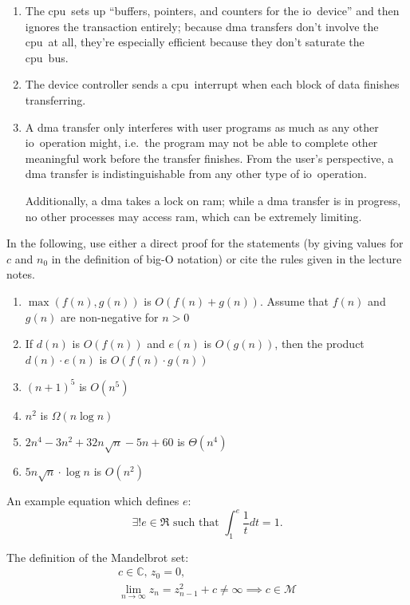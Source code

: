 \documentclass[
	gantt,
	scheme,
	assembly,
	math,
	pseudocode,
	tabu
]{brandeis-problemset}
\newcommand{\io}{\ac{io}}
\newcommand{\cpu}{\ac{cpu}}
\begin{document}
\begin{enumerate}
	\item The \cpu\ sets up ``buffers, pointers, and counters for the
		\io\ device'' and then ignores the transaction entirely;
		because \ac{dma} transfers don't involve the \cpu\ at all,
		they're especially efficient because they don't saturate the
		\cpu\ bus.
	\item The device controller sends a \cpu\ interrupt when each block of
		data finishes transferring.
	\item A \ac{dma} transfer only interferes with user programs as much
		as any other \io\ operation might, i.e.\ the program may not
		be able to complete other meaningful work before the
		transfer finishes. From the user's perspective, a \ac{dma}
		transfer is indistinguishable from any other type of \io\
		operation.

		Additionally, a \ac{dma} takes a lock on \ac{ram}; while a
		\ac{dma} transfer is in progress, no other processes may
		access \ac{ram}, which can be extremely limiting.
\end{enumerate}

\begin{problem}
	In the following, use either a direct proof for the statements (by
	giving values for $c$ and $n_0$ in the definition of big-O notation)
	or cite the rules given in the lecture notes.

	\begin{enumerate}
		\item $\max(f(n), g(n))$ is $O(f(n) + g(n))$. Assume that $f(n)$
			and $g(n)$ are non-negative for $n > 0$
		\item  If $d(n)$ is $O(f(n))$ and $e(n)$ is $O(g(n))$, then
			the product $d(n) \cdot e(n)$ is $O(f(n) \cdot g(n))$
		\item $(n + 1)^5$ is $O(n^5)$
		\item $n^2$ is $\Omega(n\log n)$
		\item $2n^4 - 3n^2 + 32n\sqrt n - 5n + 60$ is $\Theta(n^4)$
		\item $5n\sqrt n \cdot \log n$ is $O(n^2)$
	\end{enumerate}
\end{problem}

An example equation which defines $e$:
\begin{equation}
	\exists! e \in \Re \text{ such that }
	\int_1^e \frac{1}{t} dt = 1.
\end{equation}

The definition of the Mandelbrot set:
\begin{equation}
\begin{split}
		c \in \mathbb{C},\, z_0 = 0, \\
		\lim_{n \to \infty} z_n = z_{n - 1}^2 + c \ne \infty
		\implies c \in \mathcal{M}
\end{split}
\end{equation}
\end{document}
